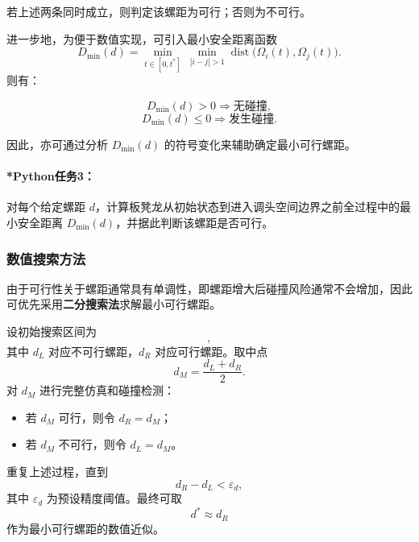 \documentclass[12pt,a4paper]{ctexart}
\begin{document}
若上述两条同时成立，则判定该螺距为可行；否则为不可行。

进一步地，为便于数值实现，可引入最小安全距离函数
\begin{equation}
D_{\min}(d)=\min_{t\in[0,t^\ast]}\ \min_{|i-j|>1}\operatorname{dist}\bigl(\Omega_i(t),\Omega_j(t)\bigr).
\end{equation}
则有：

\begin{equation}
D_{\min}(d)>0 \Rightarrow \text{无碰撞},
\end{equation}
\begin{equation}
D_{\min}(d)\le 0 \Rightarrow \text{发生碰撞}.
\end{equation}

因此，亦可通过分析 $D_{\min}(d)$ 的符号变化来辅助确定最小可行螺距。

\paragraph{*Python任务3：}
对每个给定螺距 $d$，计算板凳龙从初始状态到进入调头空间边界之前全过程中的最小安全距离 $D_{\min}(d)$，并据此判断该螺距是否可行。

\subsubsection{数值搜索方法}
由于可行性关于螺距通常具有单调性，即螺距增大后碰撞风险通常不会增加，因此可优先采用\textbf{二分搜索法}求解最小可行螺距。

设初始搜索区间为
\begin{equation}
[d_L,d_R],
\end{equation}
其中 $d_L$ 对应不可行螺距，$d_R$ 对应可行螺距。取中点
\begin{equation}
d_M=\frac{d_L+d_R}{2}.
\end{equation}
对 $d_M$ 进行完整仿真和碰撞检测：

\begin{itemize}
    \item 若 $d_M$ 可行，则令 $d_R=d_M$；
    \item 若 $d_M$ 不可行，则令 $d_L=d_M$。
\end{itemize}

重复上述过程，直到
\begin{equation}
d_R-d_L<\varepsilon_d,
\end{equation}
其中 $\varepsilon_d$ 为预设精度阈值。最终可取
\begin{equation}
d^\ast\approx d_R
\end{equation}
作为最小可行螺距的数值近似。
\end{document}
